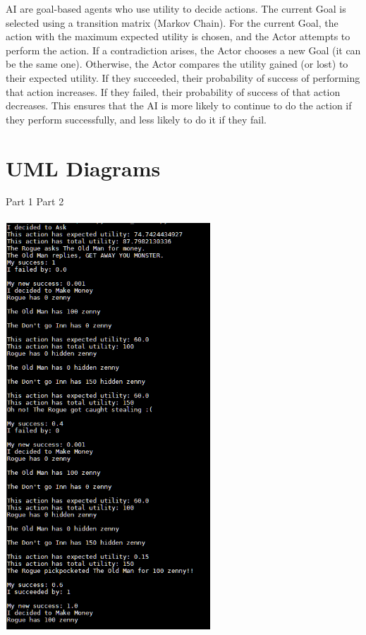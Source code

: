 \documentclass{article}
\theoremstyle{definition}
\begin{document}
  AI are goal-based agents who use utility to decide actions. The current Goal
  is selected using a transition matrix (Markov Chain). For the current Goal,
  the action with the maximum expected utility is chosen, and the Actor attempts
  to perform the action. If a contradiction arises, the Actor chooses a new Goal
  (it can be the same one). Otherwise, the Actor compares the utility gained (or lost) to their expected utility. If they succeeded, their probability of success of
  performing that action increases. If they failed, their probability of success of
  that action decreases. This ensures that the AI is more likely to continue to do
  the action if they perform successfully, and less likely to do it if they fail.


\newpage
\section*{UML Diagrams}
Part 1 \hspace{2.6in} Part 2 \\ \\
\includegraphics[height = 6in]{"UML part 1"}
\end{document}
